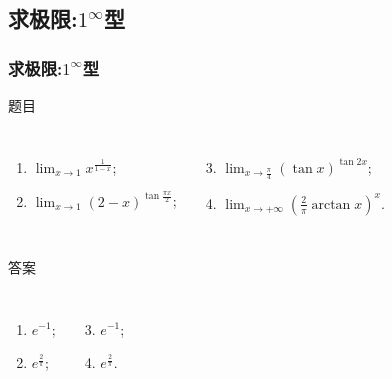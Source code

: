 \documentclass[
10pt,
aspectratio=43,
]{beamer}
\begin{document}
\subsection{求极限:$\displaystyle1^\infty$型}
\begin{frame}
	\frametitle{求极限:$\displaystyle1^\infty$型}
	\everymath{\displaystyle}
	\begin{block}{题目}
		\begin{columns}[onlytextwidth]
			\begin{enumerate}
				\item $\lim _{x \rightarrow 1} x^{\frac{1}{1-x}}$;
				\item $\lim _{x \rightarrow 1}(2-x)^{\tan \frac{\pi x}{2}}$;
			\end{enumerate}
			\begin{enumerate}
				\setcounter{enumi}{2}
				\item $\lim _{x \rightarrow \frac{\pi}{4}}(\tan x)^{\tan 2 x}$;
				\item $\lim _{x \rightarrow+\infty}\left(\frac{2}{\pi} \arctan x\right)^x$.
			\end{enumerate}
		\end{columns}
	\end{block}

	\begin{exampleblock}{答案}
		\begin{columns}[onlytextwidth]
			\begin{enumerate}
				\pause
				\item $e^{-1}$;
				\item $e^{\frac{2}{\pi}}$;
			\end{enumerate}
			\begin{enumerate}
				\setcounter{enumi}{2}
				\pause
				\item $e^{-1}$;
				\item $e^{\frac{2}{\pi}}$.
			\end{enumerate}
		\end{columns}
	\end{exampleblock}

\end{frame}
\end{document}
